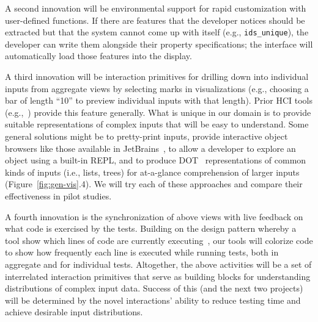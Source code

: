 {A second innovation will be environmental support for rapid customization with
user-defined functions.  If
there are features that the developer notices should be extracted but that the
system cannot come up with itself (e.g., \lstinline{ids_unique}), the developer
can
write them alongside their property specifications;
the interface will automatically load those features into the
display.

A third innovation will be interaction primitives for drilling down into
individual inputs from aggregate views by selecting marks in visualizations
(e.g., choosing a bar
of length ``10'' to preview individual inputs with that length). Prior HCI tools
(e.g.,~\cite{ref:hohman2019gamut})
provide this feature generally. What is unique in our domain is to provide
suitable representations of complex inputs that
will be easy to understand. Some general solutions might be to
pretty-print inputs, provide interactive object browsers like those available
in JetBrains~\cite{tool:jetbrains}, to allow a developer to explore an
object using a built-in REPL, and to produce
DOT~\cite{ellson_graphviz_2002} representations of common kinds of
inputs (i.e., lists, trees) for at-a-glance comprehension of
larger inputs (Figure~\ref{fig:gen-vis}.4). We will try each of these
approaches and compare their effectiveness in pilot studies.

A fourth innovation is the synchronization of above views with
live feedback on what code is exercised by the tests. Building on the design
pattern whereby a tool show which lines of code are currently
executing~\cite{ref:brandt2010rehearse,
  ref:oney2009firecrystal, ref:burg2013record}, our tools will
colorize code to show
how frequently each line is executed while running tests, both in aggregate and
for individual tests. Altogether, the above activities will be a set of
interrelated interaction primitives that serve as building blocks for
understanding distributions of complex input data. Success of this (and the next
two projects) will be determined by the novel interactions' ability to reduce
testing time and achieve desirable input distributions.


}
